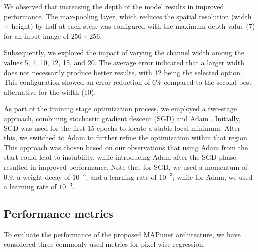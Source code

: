\documentclass[preprint,12pt]{elsarticle}
\begin{document}
We observed that increasing the depth of the model results in improved performance. The max-pooling layer, which reduces the spatial resolution (width $\times$ height) by half at each step, was configured with the maximum depth value (7) for an input image of $256 \times 256$.

Subsequently, we explored the impact of varying the channel width among the values 5, 7, 10, 12, 15, and 20. The average error indicated that a larger width does not necessarily produce better results, with 12 being the selected option. This configuration showed an error reduction of 6\% compared to the second-best alternative for the width (10).

As part of the training stage optimization process, we employed a two-stage approach, combining stochastic gradient descent (SGD) \cite{kiefer1952stochastic} and Adam \cite{kingma2014adam}. Initially, SGD was used for the first 15 epochs to locate a stable local minimum. After this, we switched to Adam to further refine the optimization within that region. This approach was chosen based on our observations that using Adam from the start could lead to instability, while introducing Adam after the SGD phase resulted in improved performance. Note that for SGD, we used a momentum of $0.9$, a weight decay of $10^{-5}$, and a learning rate of $10^{-3}$; while for Adam, we used a learning rate of $10^{-3}$.

\subsection{Performance metrics} \label{Sec:Metrics}

To evaluate the performance of the proposed MAPunet architecture, we have considered three commonly used metrics for pixel-wise regression.
\end{document}
